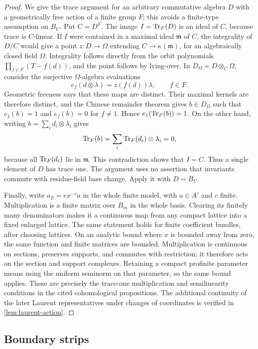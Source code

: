 \begin{proof}
We give the trace argument for an arbitrary commutative algebra
$D$ with a geometrically free action of a finite group $F$; this
avoids a finite-type assumption on $B_U$.  Put $C=D^F$.  The image
$I=\operatorname{Tr}_F(D)$ is an ideal of $C$, because trace is $C$-linear.  If
$I$ were contained in a maximal ideal $\mathfrak m$ of $C$, the
integrality of $D/C$ would give a point $z:D\to\Omega$ extending
$C\to\kappa(\mathfrak m)$, for an algebraically closed field
$\Omega$.  Integrality follows directly from the orbit polynomials
$\prod_{f\in F}(T-f(d))$, and the point follows by lying-over.
In $D_\Omega=D\otimes_C\Omega$, consider the surjective
$\Omega$-algebra evaluations
\[
 e_f(d\otimes\lambda)=z(f(d))\lambda,\qquad f\in F.
\]
Geometric freeness says that these maps are distinct.  Their
maximal kernels are therefore distinct, and the Chinese remainder
theorem gives $b\in D_\Omega$ such that
$e_1(b)=1$ and $e_f(b)=0$ for $f\ne1$.  Hence
$e_1(\operatorname{Tr}_F(b))=1$.  On the other hand, writing
$b=\sum_i d_i\otimes\lambda_i$ gives
\[
 \operatorname{Tr}_F(b)=\sum_i\operatorname{Tr}_F(d_i)\otimes\lambda_i=0,
\]
because all $\operatorname{Tr}_F(d_i)$ lie in $\mathfrak m$.  This contradiction
shows that $I=C$.  Thus a single element of $D$ has trace one.
The argument uses no assertion that invariants commute with
residue-field base change.  Apply it with $D=B_U$.

Finally, write $a_F=e x^{-c}a$ in the whole finite model, with
$a\in A'$ and $c$ finite.  Multiplication is a finite matrix over
$B_m$ in the whole basis.  Clearing its finitely many denominators
makes it a continuous map from any compact lattice into a fixed
enlarged lattice.  The same statement holds for finite coefficient
bundles, after choosing lattices.  On an analytic bound where
$x$ is bounded away from zero, the same function and finite
matrices are bounded.  Multiplication is continuous on sections,
preserves supports, and commutes with restriction; it therefore
acts on the section and support complexes.  Retaining a compact
profinite parameter means using the uniform seminorm on that
parameter, so the same bound applies.  These are precisely the
trace-one multiplication and semilinearity conditions in the
cited cohomological propositions.  The additional continuity of
the later Laurent representatives under changes of coordinates
is verified in \cref{lem:laurent-action}.
\end{proof}

\subsection{Boundary strips}

